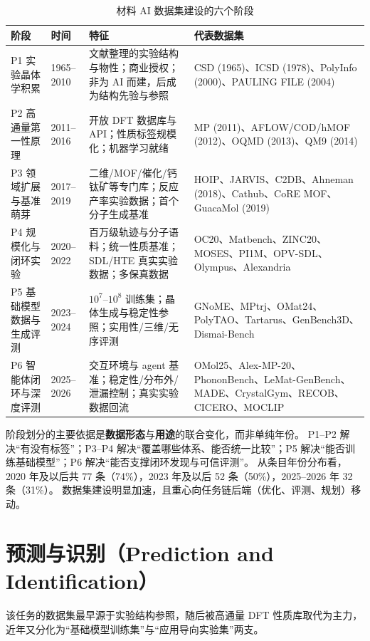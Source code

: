 \documentclass[11pt,a4paper]{ctexart}
\begin{document}
\begin{table}[h]
\centering\small
\caption{材料 AI 数据集建设的六个阶段}
\begin{tabular}{@{}p{3.1cm}p{1.7cm}p{5.4cm}p{5.4cm}@{}}
\toprule
阶段 & 时间 & 特征 & 代表数据集 \\
\midrule
P1 实验晶体学积累 & 1965--2010 & 文献整理的实验结构与物性；商业授权；非为 AI 而建，后成为结构先验与参照 & CSD (1965)、ICSD (1978)、PolyInfo (2000)、PAULING FILE (2004) \\
P2 高通量第一性原理 & 2011--2016 & 开放 DFT 数据库与 API；性质标签规模化；机器学习就绪 & MP (2011)、AFLOW/COD/hMOF (2012)、OQMD (2013)、QM9 (2014) \\
P3 领域扩展与基准萌芽 & 2017--2019 & 二维/MOF/催化/钙钛矿等专门库；反应产率实验数据；首个分子生成基准 & HOIP、JARVIS、C2DB、Ahneman (2018)、Cathub、CoRE MOF、GuacaMol (2019) \\
P4 规模化与闭环实验 & 2020--2022 & 百万级轨迹与分子语料；统一性质基准；SDL/HTE 真实实验数据；多保真数据 & OC20、Matbench、ZINC20、MOSES、PI1M、OPV-SDL、Olympus、Alexandria \\
P5 基础模型数据与生成评测 & 2023--2024 & $10^7$--$10^8$ 训练集；晶体生成与稳定性参照；实用性/三维/无序评测 & GNoME、MPtrj、OMat24、PolyTAO、Tartarus、GenBench3D、Dismai-Bench \\
P6 智能体闭环与深度评测 & 2025--2026 & 交互环境与 agent 基准；稳定性/分布外/泄漏控制；真实实验数据回流 & OMol25、Alex-MP-20、PhononBench、LeMat-GenBench、MADE、CrystalGym、RECOB、CICERO、MOCLIP \\
\bottomrule
\end{tabular}
\end{table}

阶段划分的主要依据是\textbf{数据形态}与\textbf{用途}的联合变化，而非单纯年份。
P1--P2 解决``有没有标签''；P3--P4 解决``覆盖哪些体系、能否统一比较''；P5 解决``能否训练基础模型''；P6 解决``能否支撑闭环发现与可信评测''。
从条目年份分布看，2020 年及以后共 77 条（74\%），2023 年及以后 52 条（50\%），2025--2026 年 32 条（31\%）。
数据集建设明显加速，且重心向任务链后端（优化、评测、规划）移动。

\section{预测与识别（Prediction and Identification）}

该任务的数据集最早源于实验结构参照，随后被高通量 DFT 性质库取代为主力，近年又分化为``基础模型训练集''与``应用导向实验集''两支。
\end{document}

